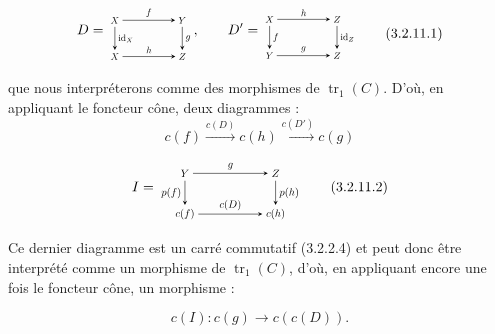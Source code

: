 \begin{equation}
  \begin{gathered}
  D=
  \begin{tikzpicture}[>=stealth,baseline=(current bounding box.center),scale=0.68,
    every node/.style={transform shape}]
    \node (X1) at (0,1.35) {$X$}; \node (Y) at (2.5,1.35) {$Y$};
    \node (X2) at (0,0) {$X$}; \node (Z) at (2.5,0) {$Z$};
    \draw[->] (X1) -- node[above] {$f$} (Y);
    \draw[->] (X1) -- node[right] {$\operatorname{id}_X$} (X2);
    \draw[->] (Y) -- node[right] {$g$} (Z);
    \draw[->] (X2) -- node[above] {$h$} (Z);
  \end{tikzpicture},
  \qquad
  D'=
  \begin{tikzpicture}[>=stealth,baseline=(current bounding box.center),scale=0.68,
    every node/.style={transform shape}]
    \node (X) at (0,1.35) {$X$}; \node (Z1) at (2.5,1.35) {$Z$};
    \node (Y) at (0,0) {$Y$}; \node (Z2) at (2.5,0) {$Z$};
    \draw[->] (X) -- node[above] {$h$} (Z1);
    \draw[->] (X) -- node[right] {$f$} (Y);
    \draw[->] (Z1) -- node[right] {$\operatorname{id}_Z$} (Z2);
    \draw[->] (Y) -- node[above] {$g$} (Z2);
  \end{tikzpicture}
  \end{gathered}
  \tag{3.2.11.1}
\end{equation}

que nous interpréterons comme des morphismes de $\operatorname{tr}_1(C)$.
D'où, en appliquant le foncteur cône, deux diagrammes :
\[
  c(f)\xrightarrow{c(D)}c(h)\xrightarrow{c(D')}c(g)
\]

\begin{equation}
  I=
  \begin{tikzpicture}[>=stealth,baseline=(current bounding box.center),scale=0.76,
    every node/.style={transform shape}]
    \node (Y) at (0,1.35) {$Y$}; \node (Z) at (3.0,1.35) {$Z$};
    \node (Cf) at (0,0) {$c(f)$}; \node (Ch) at (3.0,0) {$c(h)$};
    \draw[->] (Y) -- node[above] {$g$} (Z);
    \draw[->] (Y) -- node[left] {$p(f)$} (Cf);
    \draw[->] (Z) -- node[right] {$p(h)$} (Ch);
    \draw[->] (Cf) -- node[above] {$c(D)$} (Ch);
  \end{tikzpicture}
  \tag{3.2.11.2}
\end{equation}

Ce dernier diagramme est un carré commutatif (3.2.2.4) et peut donc être
interprété comme un morphisme de $\operatorname{tr}_1(C)$, d'où, en
appliquant encore une fois le foncteur cône, un morphisme :

\begin{equation}
  c(I)\colon c(g)\longrightarrow c(c(D)).
  \tag{3.2.11.3}
\end{equation}
\endgroup
